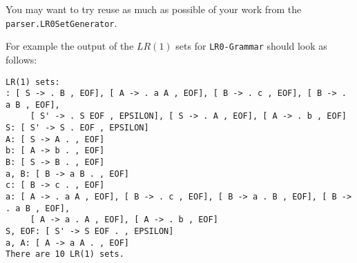 \documentclass[a4paper]{article}
\begin{document}
\begin{exercise}{20}
\begin{itemize}
    You may want to try reuse as much as possible of your work from the \texttt{parser.LR0SetGenerator}.

    For example the output of the $LR(1)$ sets for \texttt{LR0-Grammar} should look as follows:
    \begin{verbatim}
LR(1) sets:
: [ S -> . B , EOF], [ A -> . a A , EOF], [ B -> . c , EOF], [ B -> . a B , EOF],
     [ S' -> . S EOF , EPSILON], [ S -> . A , EOF], [ A -> . b , EOF]
S: [ S' -> S . EOF , EPSILON]
A: [ S -> A . , EOF]
b: [ A -> b . , EOF]
B: [ S -> B . , EOF]
a, B: [ B -> a B . , EOF]
c: [ B -> c . , EOF]
a: [ A -> . a A , EOF], [ B -> . c , EOF], [ B -> a . B , EOF], [ B -> . a B , EOF],
     [ A -> a . A , EOF], [ A -> . b , EOF]
S, EOF: [ S' -> S EOF . , EPSILON]
a, A: [ A -> a A . , EOF]
There are 10 LR(1) sets.
    \end{verbatim}
    

\end{itemize}
\end{exercise}
\end{document}
